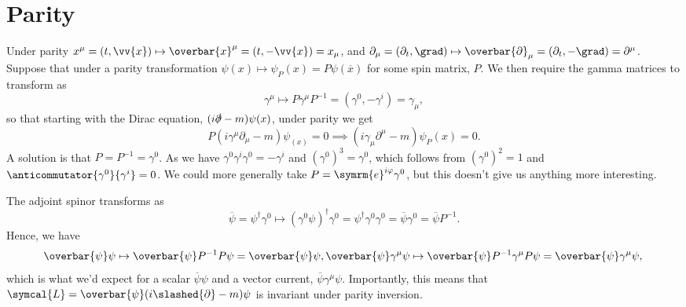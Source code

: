 \documentclass[fleqn]{NotesClass}
\newcommand{\e}{\symrm{e}}
\newcommand{\lagrangianDensity}{\symcal{L}}
\newcommand{\hermit}{{\dagger}}
\newcommand{\diracadjoint}[1]{\overbar{#1}}
\begin{document}
    \section{Parity}
    Under parity \(x^\mu = (t, \vv{x}) \mapsto \overbar{x}^\mu = (t, -\vv{x}) = x_\mu\), and \(\partial_\mu = (\partial_t, \grad) \mapsto \overbar{\partial}_\mu = (\partial_t, -\grad) = \partial^\mu\).
    Suppose that under a parity transformation \(\psi(x) \mapsto \psi_{P}(x) = P\psi(\overbar{x})\) for some spin matrix, \(P\).
    We then require the gamma matrices to transform as
    \begin{equation}
        \gamma^\mu \mapsto P\gamma^\mu P^{-1} = (\gamma^0, -\gamma^i) = \gamma_\mu,
    \end{equation}
    so that starting with the Dirac equation, \((i\slashed{\partial} - m)\psi(x)\), under parity we get
    \begin{equation}
        P(i\gamma^\mu \partial_\mu - m) \psi_(x) = 0 \implies (i\gamma_\mu \partial^\mu - m)\psi_P(x) = 0.
    \end{equation}
    A solution is that \(P = P^{-1} = \gamma^0\).
    As we have \(\gamma^0\gamma^i\gamma^0 = -\gamma^i\) and \((\gamma^0)^3 = \gamma^0\), which follows from \((\gamma^0)^2 = 1\) and \(\anticommutator{\gamma^0}{\gamma^i} = 0\).
    We could more generally take \(P = \e^{i\varphi}\gamma^0\), but this doesn't give us anything more interesting.
    
    The adjoint spinor transforms as
    \begin{equation}
        \diracadjoint{\psi} = \psi^\hermit \gamma^0 \mapsto (\gamma^0\psi)^\hermit \gamma^0 = \psi^\hermit \gamma^0 \gamma^0 = \diracadjoint{\psi}\gamma^0 = \diracadjoint{\psi}P^{-1}.
    \end{equation}
    Hence, we have
    \begin{equation}
        \diracadjoint{\psi} \psi \mapsto \diracadjoint{\psi} P^{-1}P \psi = \diracadjoint{\psi}\psi,\\
        \diracadjoint{\psi} \gamma^\mu \psi \mapsto \diracadjoint{\psi} P^{-1} \gamma^\mu P \psi = \diracadjoint{\psi} \gamma^\mu \psi,\\
    \end{equation}
    which is what we'd expect for a scalar \(\diracadjoint{\psi}\psi\) and a vector current, \(\diracadjoint{\psi}\gamma^\mu \psi\).
    Importantly, this means that \(\lagrangianDensity = \diracadjoint{\psi}(i\slashed{\partial} - m)\psi\) is invariant under parity inversion.
    
\end{document}
